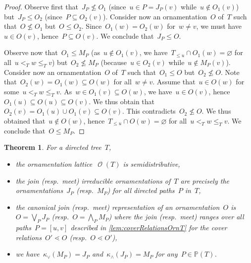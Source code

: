 \documentclass{amsart}
\newtheorem{theorem}{Theorem}[section]
\theoremstyle{definition}
\renewcommand{\c}[1]{\mathcal{#1}} %
\newcommand{\Vincent}[1]{\todo[size=\tiny,color=blue!30]{ #1 \\ \hfill --- V.}\,}
\newcommand{\meet}{\wedge} %
\newcommand{\join}{\vee} %
\newcommand{\bigMeet}{\bigwedge} %
\newcommand{\bigJoin}{\bigvee} %
\newcommand{\lessin}[2]{#1_{\le#2}} %
\DeclareMathOperator{\Orn}{\c{O}}  %
\newcommand{\PP}{\mathbb P} %
\begin{document}
\begin{proof}
Observe first that~$J_P \not\le O_1$ (since~$u \in P = J_P(v)$ while~$u \notin O_1(v)$) but~$J_P \le O_2$ (since~$P \subseteq O_2(v)$). 
Consider now an ornamentation~$O$ of~$T$ such that~$O \not\le O_1$ but~$O \le O_2$.
Since~$O_1(w) = O_2(w)$ for~$w \ne v$, we must have~$u \in O(v)$, hence~$P \subseteq O(v)$.
We conclude that~$J_P \le O$.

Observe now that~$O_1 \le M_P$ (as~$u \notin O_1(v)$, we have~$\lessin{T}{u} \cap O_1(w) = \varnothing$ for all~$u <_T w \le_T v$) but~$O_2 \not\le M_P$ (because~$u \in O_2(v)$ while~$u \notin M_P(v)$).
Consider now an ornamentation~$O$ of~$T$ such that~$O_1 \le O$ but~$O_2 \not\le O$.
Note that~$O_2(w) = O_1(w) \subseteq O(w)$ for all~$w \ne v$.
Assume that~$u \in O(w)$ for some~$u <_T w \le_T v$.
As~$w \in O_1(v) \subseteq O(w)$, we have~$u \in O(v)$, hence~$O_1(u) \subseteq O(u) \subseteq O(v)$.
We thus obtain that~$O_2(v) = O_1(u) \cup O_1(v) \subseteq O(v)$.
This contradicts~$O_2 \not\le O$.
We thus obtained that~$u \notin O(w)$, hence~$\lessin{T}{u} \cap O(w) = \varnothing$ for all~$u <_T w \le_T v$.
We conclude that~$O \le M_P$.
\end{proof}

\begin{theorem}
\label{thm:OrnSemidistributiveT}
For a directed tree~$T$, 
\begin{itemize}
\item the ornamentation lattice~$\Orn(T)$ is semidistributive,
\item the join (resp.~meet) irreducible ornamentations of~$T$ are precisely the ornamentations~$J_P$ (resp.~$M_P$) for all directed paths~$P$ in~$T$,
\item the canonical join (resp.~meet) representation of an ornamentation~$O$ is~$O = \bigJoin_P J_P$ (resp.~$O = \bigMeet_P M_P$) where the join (resp.~meet) ranges over all paths~$P = [u,v]$ described in \cref{lem:coverRelationsOrnT} for the cover relations~$O' \lessdot O$ (resp.~$O \lessdot O'$), %
\item we have~$\kappa_\join(M_P) = J_P$ and~$\kappa_\meet(J_P) = M_P$ for any~$P \in \PP(T)$.
\end{itemize}
\end{theorem}
\end{document}
